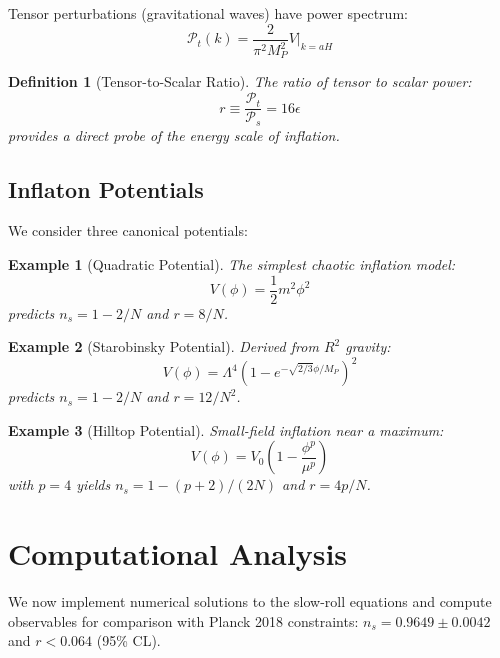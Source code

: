\documentclass[a4paper, 11pt]{article}
\newtheorem{definition}{Definition}[section]
\newtheorem{example}{Example}[section]
\begin{document}
Tensor perturbations (gravitational waves) have power spectrum:
\begin{equation}
\mathcal{P}_t(k) = \frac{2}{\pi^2 M_P^2} V \bigg|_{k=aH}
\end{equation}

\begin{definition}[Tensor-to-Scalar Ratio]
The ratio of tensor to scalar power:
\begin{equation}
r \equiv \frac{\mathcal{P}_t}{\mathcal{P}_s} = 16\epsilon
\end{equation}
provides a direct probe of the energy scale of inflation.
\end{definition}

\subsection{Inflaton Potentials}

We consider three canonical potentials:

\begin{example}[Quadratic Potential]
The simplest chaotic inflation model:
\begin{equation}
V(\phi) = \frac{1}{2}m^2\phi^2
\end{equation}
predicts $n_s = 1 - 2/N$ and $r = 8/N$.
\end{example}

\begin{example}[Starobinsky Potential]
Derived from $R^2$ gravity:
\begin{equation}
V(\phi) = \Lambda^4 \left(1 - e^{-\sqrt{2/3}\phi/M_P}\right)^2
\end{equation}
predicts $n_s = 1 - 2/N$ and $r = 12/N^2$.
\end{example}

\begin{example}[Hilltop Potential]
Small-field inflation near a maximum:
\begin{equation}
V(\phi) = V_0\left(1 - \frac{\phi^p}{\mu^p}\right)
\end{equation}
with $p = 4$ yields $n_s = 1 - (p+2)/(2N)$ and $r = 4p/N$.
\end{example}

\section{Computational Analysis}

We now implement numerical solutions to the slow-roll equations and compute observables for
comparison with Planck 2018 constraints: $n_s = 0.9649 \pm 0.0042$ and $r < 0.064$ (95\% CL).
\end{document}
